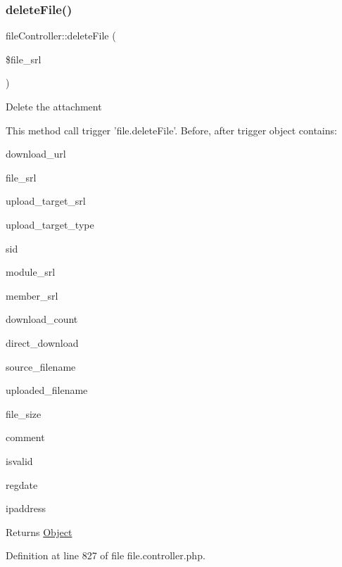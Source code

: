 \subsubsection{\texorpdfstring{delete\+File()}{deleteFile()}}
{\footnotesize\ttfamily file\+Controller\+::delete\+File (\begin{DoxyParamCaption}\item[{}]{\$file\+\_\+srl }\end{DoxyParamCaption})}

Delete the attachment


\begin{DoxyPre}
This method call trigger 'file.deleteFile'.
Before, after trigger object contains:
\begin{DoxyItemize}
\item download\_url
\item file\_srl
\item upload\_target\_srl
\item upload\_target\_type
\item sid
\item module\_srl
\item member\_srl
\item download\_count
\item direct\_download
\item source\_filename
\item uploaded\_filename
\item file\_size
\item comment
\item isvalid
\item regdate
\item ipaddress

\end{DoxyItemize}\end{DoxyPre}



\begin{DoxyPre}
\begin{DoxyReturn}{Returns}
\hyperlink{classObject}{Object}

\end{DoxyReturn}
\end{DoxyPre}


Definition at line 827 of file file.\+controller.\+php.

